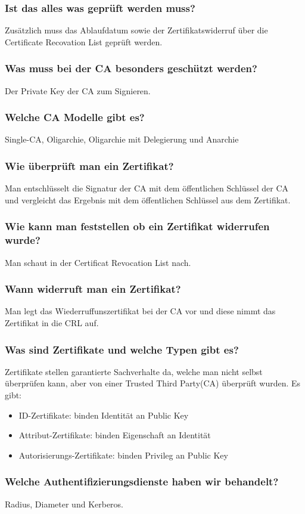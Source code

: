 	\subsubsection{Ist das alles was geprüft werden muss?}
	Zusätzlich muss das Ablaufdatum sowie der Zertifikatswiderruf über die Certificate Recovation List geprüft werden.
	
	\subsubsection{Was muss bei der CA besonders geschützt werden?}
	Der Private Key der CA zum Signieren.
	
	\subsubsection{Welche CA Modelle gibt es?}
	Single-CA, Oligarchie, Oligarchie mit Delegierung und Anarchie
	
	\subsubsection{Wie überprüft man ein Zertifikat?}
	Man entschlüsselt die Signatur der CA mit dem öffentlichen Schlüssel der CA und vergleicht das Ergebnis mit dem öffentlichen Schlüssel aus dem Zertifikat.
	
	\subsubsection{Wie kann man feststellen ob ein Zertifikat widerrufen wurde?}
	Man schaut in der Certificat Revocation List nach.
	\subsubsection{Wann widerruft man ein Zertifikat?}
	Man legt das Wiederruffunszertifikat bei der CA vor und diese nimmt das Zertifikat in die CRL auf.
	
	\subsubsection{Was sind Zertifikate und welche Typen gibt es?}
	Zertifikate stellen garantierte Sachverhalte da, welche man nicht selbst überprüfen kann, aber von einer Trusted Third Party(CA) überprüft wurden. 
	Es gibt: 
	\begin{itemize}
		\item ID-Zertifikate: binden Identität an Public Key
		\item Attribut-Zertifikate: binden Eigenschaft an Identität
		\item Autorisierungs-Zertifikate: binden Privileg an Public Key
	\end{itemize}
		
	\subsubsection{Welche Authentifizierungsdienste haben wir behandelt?}
	Radius, Diameter und Kerberos.
	
	

